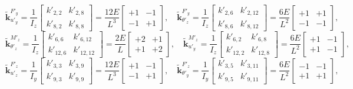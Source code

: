 \documentclass[12pt,a4paper,article]{memoir} %
\begin{document}
\begin{equation}
  \tilde{\mathbf{k}}_{u'_y}^{F'_y} = \frac{1}{I_z} \left[ \begin{array}{cc}
      k'_{2,2} & k'_{2,8} \\ k'_{8,2} & k'_{8,8} \end{array} \right] = \frac{12E}{L^3} \left[ \begin{array}{cc}
      +1 & -1 \\ -1 & +1 \end{array} \right], \quad
  \tilde{\mathbf{k}}_{\theta'_z}^{F'_y} = \frac{1}{I_z} \left[ \begin{array}{cc}
      k'_{2,6} & k'_{2,12} \\ k'_{8,6} & k'_{8,12} \end{array} \right] = \frac{6E}{L^2} \left[ \begin{array}{cc}
      +1 & +1 \\ -1 & -1 \end{array} \right],
\end{equation}
\begin{equation}
  \tilde{\mathbf{k}}_{\theta'_z}^{M'_z} = \frac{1}{I_z} \left[ \begin{array}{cc}
      k'_{6,6} & k'_{6,12} \\ k'_{12,6} & k'_{12,12} \end{array} \right] = \frac{2E}{L} \left[ \begin{array}{cc}
      +2 & +1 \\ +1 & +2 \end{array} \right], \quad
  \tilde{\mathbf{k}}_{u'_y}^{M'_z} = \frac{1}{I_z} \left[ \begin{array}{cc}
      k'_{6,2} & k'_{6,8} \\ k'_{12,2} & k'_{12,8} \end{array} \right] = \frac{6E}{L^2} \left[ \begin{array}{cc}
      +1 & -1 \\ +1 & -1 \end{array} \right],
\end{equation}
\begin{equation}
  \tilde{\mathbf{k}}_{u'_z}^{F'_z} = \frac{1}{I_y} \left[ \begin{array}{cc}
      k'_{3,3} & k'_{3,9} \\ k'_{9,3} & k'_{9,9} \end{array} \right] = \frac{12E}{L^3} \left[ \begin{array}{cc}
      +1 & -1 \\ -1 & +1 \end{array} \right], \quad
  \tilde{\mathbf{k}}_{\theta'_y}^{F'_z} = \frac{1}{I_y} \left[ \begin{array}{cc}
      k'_{3,5} & k'_{3,11} \\ k'_{9,5} & k'_{9,11} \end{array} \right] = \frac{6E}{L^2} \left[ \begin{array}{cc}
      -1 & -1 \\ +1 & +1 \end{array} \right],
\end{equation}
\end{document}
